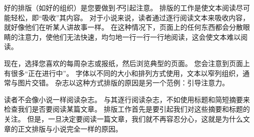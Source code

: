 
好的排版（如好的组织）是您要做到\emph{不}引起注意。 排版的工作是使文本阅读尽可能轻松，即``吸收''其内容。 对于小说来说，读者通过逐行阅读文本来吸收内容，就好像他们在听某人讲故事一样。 在这种情况下，页面上的任何东西都会分散眼睛的注意力，使他们无法快速，均匀地一行一行一行地阅读，这会使文本难以阅读。


现在，选择您喜欢的每周杂志或报纸，然后浏览典型的页面。 您会注意到页面上有很多``正在进行中''。 字体以不同的大小和排列方式使用，文本以窄列组织，通常与图片交错。 杂志以这种方式排版的原因是另一个范例：引导注意力。


读者不会像小说一样阅读杂志。 与其逐行阅读杂志，不如使用标题和简短摘要来检查我们是否要阅读某篇文章。 排版工作首先是要引起我们对这些摘要和标题的关注。 但是，一旦决定要阅读一篇文章，我们就不再容忍分心，这就是为什么文章的正文排版与小说完全一样的原因。


